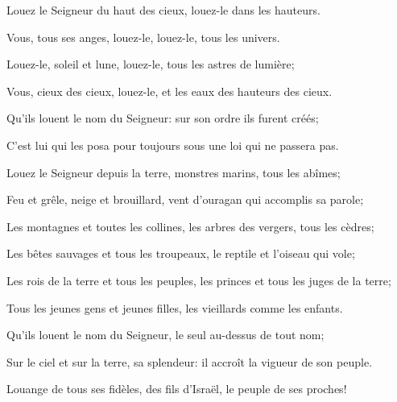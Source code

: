 \item Louez le Seigneur du haut des cieux,
louez-le dans les hauteurs.

\item Vous, tous ses anges, louez-le,
louez-le, tous les univers.

\item Louez-le, soleil et lune,
louez-le, tous les astres de lumière;

\item Vous, cieux des cieux, louez-le,
et les eaux des hauteurs des cieux.

\item Qu’ils louent le nom du Seigneur:
sur son ordre ils furent créés;

\item C’est lui qui les posa pour toujours
sous une loi qui ne passera pas.

\item Louez le Seigneur depuis la terre,
monstres marins, tous les abîmes;

\item Feu et grêle, neige et brouillard,
vent d’ouragan qui accomplis sa parole;

\item Les montagnes et toutes les collines,
les arbres des vergers, tous les cèdres;

\item Les bêtes sauvages et tous les troupeaux,
le reptile et l’oiseau qui vole;

\item Les rois de la terre et tous les peuples,
les princes et tous les juges de la terre;

\item Tous les jeunes gens et jeunes filles,
les vieillards comme les enfants.

\item Qu’ils louent le nom du Seigneur,
le seul au-dessus de tout nom;

\item Sur le ciel et sur la terre, sa splendeur:
il accroît la vigueur de son peuple.

\item Louange de tous ses fidèles,
des fils d’Israël, le peuple de ses proches!